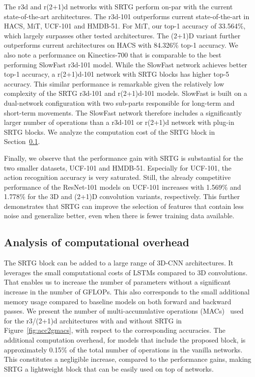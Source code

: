\documentclass[final,5p,times,twocolumn]{elsarticle}
\begin{document}
The r3d and r(2+1)d networks with SRTG perform on-par with the current state-of-the-art architectures. The r3d-101 outperforms current state-of-the-art in HACS, MiT, UCF-101 and HMDB-51. For MiT, our top-1 accuracy of 33.564\%, which largely surpasses other tested architectures. The (2+1)D variant further outperforms current architectures on HACS with 84.326\% top-1 accuracy. We also note a performance on Kinectics-700 that is comparable to the best performing SlowFast r3d-101 model. While the SlowFast network achieves better top-1 accuracy, a r(2+1)d-101 network with SRTG blocks has higher top-5 accuracy. This similar performance is remarkable given the relatively low complexity of the SRTG r3d-101 and r(2+1)d-101 models. SlowFast is built on a dual-network configuration with two sub-parts responsible for long-term and short-term movements. The SlowFast network therefore includes a significantly larger number of operations than a r3d-101 or r(2+1)d network with plug-in SRTG blocks. We analyze the computation cost of the SRTG block in Section~\ref{sec:results::subsec:conv}.

Finally, we observe that the performance gain with SRTG is substantial for the two smaller datasets, UCF-101 and HMDB-51. Especially for UCF-101, the action recognition accuracy is very saturated. Still, the already competitive performance of the ResNet-101 models on UCF-101 increases with 1.569\% and 1.778\% for the 3D and (2+1)D convolution variants, respectively. This further demonstrates that SRTG can improve the selection of features that contain less noise and generalize better, even when there is fewer training data available.


\subsection{Analysis of computational overhead}
\label{sec:results::subsec:conv}
The SRTG block can be added to a large range of 3D-CNN architectures. It leverages the small computational costs of LSTMs compared to 3D convolutions. That enables us to increase the number of parameters without a significant increase in the number of GFLOPs. This also corresponds to the small additional memory usage compared to baseline models on both forward and backward passes. We present the number of multi-accumulative operations (MACs)\footnotemark~ used for the r3/(2+1)d architectures with and without SRTG in Figure~\ref{fig:acc2gmacs}, with respect to the corresponding accuracies. The additional computation overhead, for models that include the proposed block, is approximately 0.15\% of the total number of operations in the vanilla networks. This constitutes a negligible increase, compared to the performance gains, making SRTG a lightweight block that can be easily used on top of networks.
\end{document}
